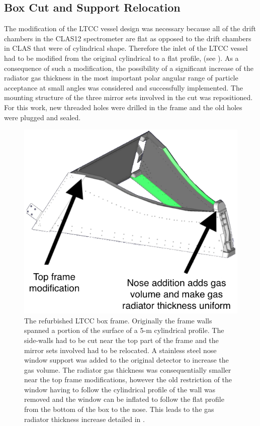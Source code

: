 \subsection{Box Cut and Support Relocation}
\label{sec:mirrorRepos}

The modification of the LTCC vessel design was necessary because all of the drift chambers in the CLAS12
spectrometer are flat as opposed to the drift chambers in CLAS that were of cylindrical shape. Therefore the
inlet of the LTCC vessel had to be modified from the original cylindrical to a flat profile, (see ). As
a consequence of such a modification, the possibility of a significant increase of the radiator gas thickness in the
most important polar angular range of particle acceptance at small angles was considered and successfully
implemented. The mounting structure of the three mirror sets involved in the cut was repositioned. For this work,
new threaded holes were drilled in the frame and the old holes were plugged and sealed.

\begin{figure}[ht]
	\centering
	\includegraphics[width=1.0\columnwidth, height=0.75\columnwidth]{img/boxCut.png}
	\caption{The refurbished LTCC box frame. Originally the frame walls spanned a portion of the surface of a 5-m
          cylindrical profile. The side-walls had to be cut near the top part of the frame and the mirror sets involved had
          to be relocated. A stainless steel nose window support was added to the original detector to increase the gas
          volume. The radiator gas thickness was consequentially smaller near the top frame modifications, however the
          old restriction of the window having to follow the cylindrical profile of the wall was removed and the window can
          be inflated to follow the flat profile from the bottom of the box to the nose. This leads to the gas radiator
          thickness increase detailed in .}
	\label{fig:boxCut}
\end{figure}

